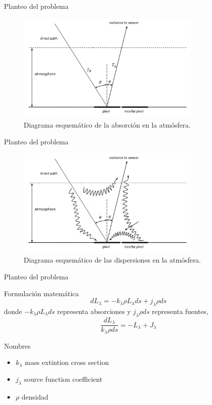 \documentclass[]{beamer}
\begin{document}
\begin{frame}{Planteo del problema}
  \begin{figure}
  \centering
  \includegraphics[width=0.8\textwidth]{imagenes/tatmo.png}
  \caption{Diagrama esquemático de la absorción en la atmósfera.}
  \end{figure}
\end{frame}

\begin{frame}{Planteo del problema}
  \begin{figure}
  \centering
  \includegraphics[width=0.8\textwidth]{imagenes/patmo.png}
  \caption{Diagrama esquemático de las dispersiones en la atmósfera.}
  \end{figure}
\end{frame}

\begin{frame}{Planteo del problema}
  \begin{block}{Formulación matemática}
    $$d L_\lambda = -k_\lambda \rho L_\lambda ds + j_\lambda \rho ds$$
    donde $-k_\lambda \rho L_\lambda ds$ representa absorciones y $j_\lambda \rho ds$ representa fuentes, \pause
    $$ \frac{dL_\lambda}{k_\lambda \rho ds} = -L_\lambda + J_\lambda$$
  \end{block}
  \pause
  \begin{block}{Nombres}
    \begin{itemize}
      \item $k_\lambda$ mass extintion cross section
      \item $j_\lambda$ source function coefficient
      \item $\rho$ densidad
    \end{itemize}
  \end{block}
\end{frame}
\end{document}
